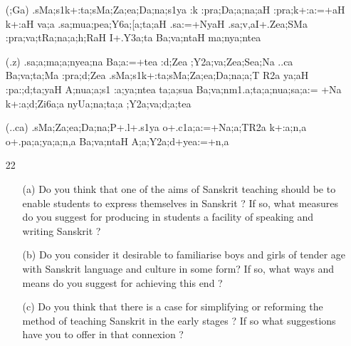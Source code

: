 \begin{itemize}
\begin{itemize}
          \item[({\sktf ;Ga})] {\sktf .sMa;s1k+:ta;sMa;Za;ea;Da;na;s1ya :k :pra;Da;a;na;aH
:pra;k+:a:=+aH k+:aH va;a .sa;mua;pea;Y6a;[a;ta;aH
.sa:=+NyaH .sa;v,aI+.Zea;SMa :pra;va;tRa;na;a;h;RaH\ZF{,} I+.Y3a;ta Ba;va;ntaH
ma;nya;ntea }
          
          \item[({\sktf .z})] {\sktf .sa;a;ma;a;nyea;na Ba;a:=+tea
:d;Zea\ZF{,} ;Y2a;va;Zea;Sea;Na ..ca Ba;va;ta;Ma
:pra;d;Zea\ZF{,} .sMa;s1k+:ta;sMa;Za;ea;Da;na;a;T%
R2a ya;aH :pa:;d;ta;yaH A;nua;a;s1%
:a;ya;ntea\ZF{,} ta;a;sua Ba;va;nm1.a;ta;a;nua;sa;a:=%
+Na k+:a;d;Zi6a;a nyUa;na;ta;a
;Y2a;va;d;a;tea }
          
          \item[({\sktf ..ca})] {\sktf .sMa;Za;ea;Da;na;P+.l+.s1ya
o+.c1a;a:=+Na;a;TR2a k+:a;n,a o+.pa;a;ya;a;n,a Ba;va;ntaH
A;a;Y2a;d+yea:=+n,a }
          
          \end{itemize}
\end{itemize}

{\rm 
\begin{itemize}

\item[22]  \begin{itemize}                 
             \item[(a)] Do you think that one of the aims of Sanskrit teaching should be to enable students to express themselves in Sanskrit ? If so, what measures do you suggest for producing in students a facility of speaking and writing Sanskrit ?
             
             \item[(b)] Do you consider it desirable to familiarise boys and girls of tender age with Sanskrit language and culture in some form? If so, what ways and means do you suggest for achieving this end ?
             
             \item[(c)] Do you think that there is a case for simplifying or reforming the method of teaching Sanskrit in the early stages ? If so what suggestions have you to offer in that connexion ?
             
             \end{itemize}
              
\end{itemize}
}
